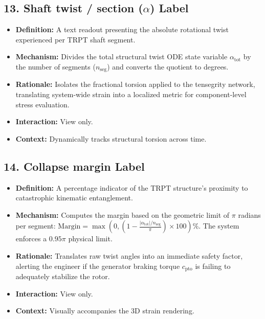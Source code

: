 \documentclass[11pt,a4paper]{article}
\begin{document}
\subsection{13. Shaft twist / section ($\alpha$) Label}
\begin{itemize}
    \item \textbf{Definition:} A text readout presenting the absolute rotational twist experienced per TRPT shaft segment.
    \item \textbf{Mechanism:} Divides the total structural twist ODE state variable $\alpha_{\text{tot}}$ by the number of segments ($n_{\text{seg}}$) and converts the quotient to degrees.
    \item \textbf{Rationale:} Isolates the fractional torsion applied to the tensegrity network, translating system-wide strain into a localized metric for component-level stress evaluation.
    \item \textbf{Interaction:} View only.
    \item \textbf{Context:} Dynamically tracks structural torsion across time.
\end{itemize}

\subsection{14. Collapse margin Label}
\begin{itemize}
    \item \textbf{Definition:} A percentage indicator of the TRPT structure's proximity to catastrophic kinematic entanglement.
    \item \textbf{Mechanism:} Computes the margin based on the geometric limit of $\pi$ radians per segment: $\text{Margin} = \max\left(0, \left(1 - \frac{|\alpha_{\text{tot}}| / n_{\text{seg}}}{\pi}\right) \times 100\right)\%$. The system enforces a $0.95\pi$ physical limit.
    \item \textbf{Rationale:} Translates raw twist angles into an immediate safety factor, alerting the engineer if the generator braking torque $c_{\text{pto}}$ is failing to adequately stabilize the rotor.
    \item \textbf{Interaction:} View only.
    \item \textbf{Context:} Visually accompanies the 3D strain rendering.
\end{itemize}
\end{document}
